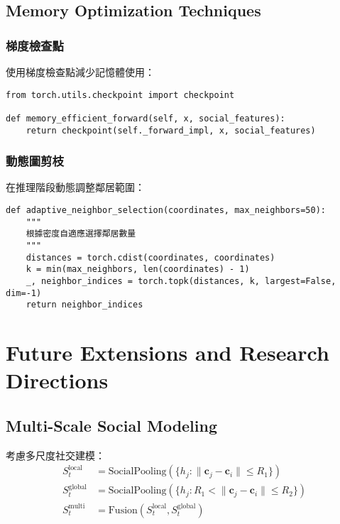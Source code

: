 \documentclass[11pt,a4paper]{article}
\begin{document}
\subsection{Memory Optimization Techniques}

\subsubsection{梯度檢查點}
使用梯度檢查點減少記憶體使用：
\begin{lstlisting}[style=pythonstyle]
from torch.utils.checkpoint import checkpoint

def memory_efficient_forward(self, x, social_features):
    return checkpoint(self._forward_impl, x, social_features)
\end{lstlisting}

\subsubsection{動態圖剪枝}
在推理階段動態調整鄰居範圍：
\begin{lstlisting}[style=pythonstyle, caption={自適應鄰居選擇}]
def adaptive_neighbor_selection(coordinates, max_neighbors=50):
    """
    根據密度自適應選擇鄰居數量
    """
    distances = torch.cdist(coordinates, coordinates)
    k = min(max_neighbors, len(coordinates) - 1)
    _, neighbor_indices = torch.topk(distances, k, largest=False, dim=-1)
    return neighbor_indices
\end{lstlisting}

\section{Future Extensions and Research Directions}

\subsection{Multi-Scale Social Modeling}

考慮多尺度社交建模：
\begin{align}
S_t^{\text{local}} &= \text{SocialPooling}(\{h_j : \|\mathbf{c}_j - \mathbf{c}_i\| \leq R_1\}) \\
S_t^{\text{global}} &= \text{SocialPooling}(\{h_j : R_1 < \|\mathbf{c}_j - \mathbf{c}_i\| \leq R_2\}) \\
S_t^{\text{multi}} &= \text{Fusion}(S_t^{\text{local}}, S_t^{\text{global}})
\end{align}
\end{document}
